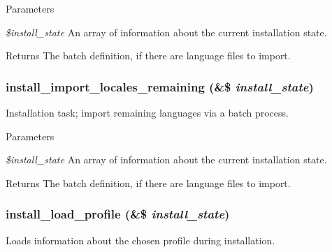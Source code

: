 \begin{DoxyParams}{Parameters}
\item[{\em \$install\_\-state}]An array of information about the current installation state.\end{DoxyParams}
\begin{DoxyReturn}{Returns}
The batch definition, if there are language files to import. 
\end{DoxyReturn}
\hypertarget{install_8core_8inc_a6a48bc00f0f8e3026dd09286f93b46aa}{
\subsubsection[{install\_\-import\_\-locales\_\-remaining}]{\setlength{\rightskip}{0pt plus 5cm}install\_\-import\_\-locales\_\-remaining (\&\$ {\em install\_\-state})}}
\label{install_8core_8inc_a6a48bc00f0f8e3026dd09286f93b46aa}
Installation task; import remaining languages via a batch process.


\begin{DoxyParams}{Parameters}
\item[{\em \$install\_\-state}]An array of information about the current installation state.\end{DoxyParams}
\begin{DoxyReturn}{Returns}
The batch definition, if there are language files to import. 
\end{DoxyReturn}
\hypertarget{install_8core_8inc_a8ef7587c3c0812d35629396360b3797e}{
\subsubsection[{install\_\-load\_\-profile}]{\setlength{\rightskip}{0pt plus 5cm}install\_\-load\_\-profile (\&\$ {\em install\_\-state})}}
\label{install_8core_8inc_a8ef7587c3c0812d35629396360b3797e}
Loads information about the chosen profile during installation.


